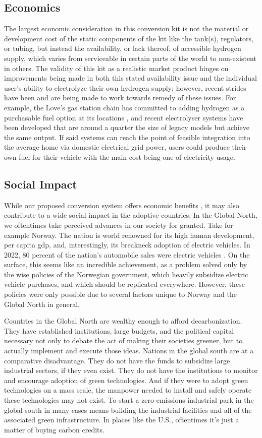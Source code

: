 \documentclass[conf]{new-aiaa}
\begin{document}
\subsection{Economics}
The largest economic consideration in this conversion kit is not the material or development cost of the static components of the kit like the tank(s), regulators, or tubing, but instead the availability, or lack thereof, of accessible hydrogen supply, which varies from serviceable in certain parts of the world to non-existent in others.  The validity of this kit as a realistic market product hinges on improvements being made in both this stated availability issue and the individual user's ability to electrolyze their own hydrogen supply; however, recent strides have been and are being made to work towards remedy of these issues.  For example, the Love's gas station chain has committed to adding hydrogen as a purchasable fuel option at its locations \cite{loves}, and recent electrolyser systems have been developed that are around a quarter the size of legacy models but achieve the same output.  If said systems can reach the point of feasible integration into the average home via domestic electrical grid power, users could produce their own fuel for their vehicle with the main cost being one of electricity usage.

\subsection{Social Impact}
While our proposed conversion system offers economic benefits , it may also contribute to a wide social impact in the adoptive countries. In the Global North, we oftentimes take perceived advances in our society for granted. Take for example Norway. The nation is world renowned for its high human development, per capita gdp, and, interestingly, its breakneck adoption of electric vehicles. In 2022, 80 percent of the nation’s automobile sales were electric vehicles \cite{norway}. On the surface, this seems like an incredible achievement, as a problem solved only by the wise policies of the Norwegian government, which heavily subsidize electric vehicle purchases, and which should be replicated everywhere. However, these policies were only possible due to several factors unique to Norway and the Global North in general.

Countries in the Global North are wealthy enough to afford decarbonization. They have established institutions, large budgets, and the political capital necessary not only to debate the act of making their societies greener, but to actually implement and execute those ideas. Nations in the global south are at a comparative disadvantage. They do not have the funds to subsidize large industrial sectors, if they even exist. They do not have the institutions to monitor and encourage adoption of green technologies. And if they were to adopt green technologies on a mass scale, the manpower needed to install and safely operate these technologies may not exist. To start a zero-emissions industrial park in the global south in many cases means building the industrial facilities and all of the associated green infrastructure. In places like the U.S., oftentimes it's just a matter of buying carbon credits.
\end{document}
